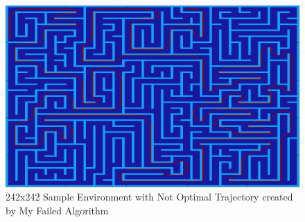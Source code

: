 \documentclass{article}
\begin{document}
\begin{figure}[ht!]
\begin{center}
\includegraphics[scale=0.32]{failedResult1.png}
\caption{242x242 Sample Environment with Not Optimal Trajectory created by My Failed Algorithm}
\end{center}
\end{figure}
\end{document}

